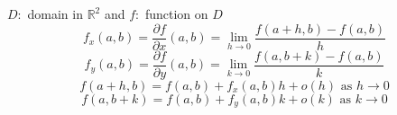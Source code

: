 \documentclass[a4paper,10pt]{article}
\newcommand{\R}{\mathbb{R}}
\begin{document}
$ D : $ domain in $ \R^2 $ and $ f : $ function on $ D $
\[ f_{x}(a,b) = \dfrac{\partial f}{\partial x} (a,b) = \lim\limits_{h\rightarrow 0} \dfrac{f(a+h,b)-f(a,b)}{h} \]
\[ f_{y}(a,b) = \dfrac{\partial f}{\partial y} (a,b) = \lim\limits_{k\rightarrow 0} \dfrac{f(a,b+k)-f(a,b)}{k} \]
\[ f(a+h,b) = f(a,b) +f_{x}(a,b)h + o(h) \text{ as } h\rightarrow 0 \]
\[ f(a,b+k) = f(a,b) +f_{y}(a,b)k + o(k) \text{ as } k\rightarrow 0 \]
\end{document}
